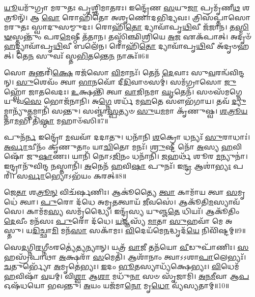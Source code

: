 \-\ul{𑌯𑍂}\-𑌯𑌮𑍁᳴𑌗𑍍𑌰𑌾 𑌮𑌰𑍁𑌤𑌃 𑌪𑍃𑌶𑍍𑌞𑌿𑌮𑌾𑌤𑌰𑌃।
𑌇𑌨𑍍𑌦𑍍𑌰𑍇᳴𑌣 \ul{𑌸}\-𑌯𑍁\-\ul{𑌜𑌾} 𑌪𑍍𑌰𑌮𑍃᳴𑌣𑍀\-\ul{𑌥} 𑌶𑌤𑍍𑌰𑍂𑌨𑍍᳴।
𑌆 \ul{𑌵𑍋} 𑌰𑍋𑌹𑌿᳴𑌤𑍋 𑌅𑌶𑍃𑌣𑍋𑌦𑌭𑌿𑌦𑍍𑌯𑌵𑌃।
𑌤𑍍𑌰𑌿𑌸᳴𑌪𑍍𑌤𑌾𑌸𑍋 𑌮𑌰𑍁𑌤𑌃 𑌸𑍍𑌵𑌾𑌦𑍁𑌸𑌮𑍍𑌮𑍁𑌦𑌃।
𑌰𑍋𑌹𑌿᳴\-\ul{𑌤𑍋} 𑌦𑍍𑌯𑌾𑌵𑌾᳴𑌪𑍃\-\ul{𑌥𑌿}\-𑌵𑍀 𑌜᳴𑌜𑌾𑌨।
𑌤\-\ul{𑌸𑍍𑌮𑌿}\-\-\ul{𑍟}\-𑌸𑍍𑌤𑌨𑍍𑌤𑍁𑌂᳴ 𑌪𑌰\-\ul{𑌮𑍇}\-𑌷𑍍𑌠𑍀 𑌤᳴𑌤𑌾𑌨।
𑌤𑌸𑍍𑌮𑌿᳴𑌞𑍍𑌛𑌿𑌶𑍍𑌰𑌿𑌯𑍇 \ul{𑌅}\-𑌜 𑌏𑌕᳴𑌪𑌾𑌤𑍍।
𑌅𑌦𑍃𑍞᳴\-\ul{𑌹}\-𑌦𑍍𑌦𑍍𑌯𑌾𑌵𑌾᳴𑌪𑍃\-\ul{𑌥𑌿}\-𑌵𑍀 𑌬𑌲𑍇᳴𑌨।
𑌰𑍋𑌹𑌿᳴\-\ul{𑌤𑍋} 𑌦𑍍𑌯𑌾𑌵𑌾᳴𑌪𑍃\-\ul{𑌥𑌿}\-𑌵𑍀 𑌅᳴𑌦𑍃𑍞𑌹𑌤𑍍।
𑌤𑍇\-\ul{𑌨} 𑌸𑍁𑌵𑌃᳴ 𑌸𑍍𑌤\-\ul{𑌭𑌿}\-𑌤𑌨𑍍𑌤𑍇\-\ul{𑌨} 𑌨𑌾𑌕𑌃᳴॥6॥

𑌸𑍋 \ul{𑌅}\-𑌨𑍍𑌤𑌰𑌿᳴\-\ul{𑌕𑍍𑌷𑍇} 𑌰𑌜᳴𑌸𑍋 \ul{𑌵𑌿}\-𑌮𑌾𑌨𑌃᳴।
𑌤𑍇𑌨᳴ \ul{𑌦𑍇}\-𑌵𑌾𑌃 𑌸𑍁\-\ul{𑌵}\-𑌰𑌨𑍍𑌵᳴𑌵𑌿𑌨𑍍𑌦𑌨𑍍।
\-\ul{𑌸𑍁}\-𑌶𑍇𑌵𑌂᳴ 𑌤𑍍𑌵𑌾 \ul{𑌭𑌾}\-𑌨𑌵𑍋᳴ 𑌦𑍀\-\ul{𑌦𑌿}\-𑌵𑌾𑍞𑌸𑌮𑍍॑।
𑌸𑌮᳴𑌗𑍍𑌰𑌾𑌸𑍋 \ul{𑌜𑍁}\-𑌹𑍍𑌵𑍋᳴ 𑌜𑌾𑌤𑌵𑍇𑌦𑌃।
\-\ul{𑌉}\-𑌕𑍍𑌷𑌨𑍍𑌤𑌿᳴ 𑌤𑍍𑌵𑌾 \ul{𑌵𑌾}\-𑌜𑌿\-\ul{𑌨}\-𑌮𑌾 \ul{𑌘𑍃}\-𑌤𑍇𑌨᳴।
𑌸𑍞𑌸᳴𑌮𑌗𑍍𑌨𑍇 𑌯𑍁𑌵\-\ul{𑌸𑍇} 𑌭𑍋𑌜᳴𑌨𑌾𑌨𑌿।
𑌅\-\ul{𑌗𑍍𑌨𑍇} 𑌶𑌰𑍍𑌧᳴ 𑌮\-\ul{𑌹}\-𑌤𑍇 𑌸𑍗𑌭᳴𑌗𑌾𑌯।
𑌤𑌵᳴ \ul{𑌦𑍍𑌯𑍁}\-𑌮𑍍𑌨𑌾𑌨𑍍𑌯𑍁᳴\-\ul{𑌤𑍍𑌤}\-𑌮𑌾𑌨𑌿᳴ 𑌸𑌨𑍍𑌤𑍁।
𑌸𑌞𑍍𑌜𑌾॑\-\ul{𑌸𑍍𑌪}\-𑌤𑍍𑌯𑍞 \ul{𑌸𑍁}\-𑌯\-\ul{𑌮}\-𑌮𑌾 𑌕𑍃᳴𑌣𑍁𑌷𑍍𑌵।
\-\ul{𑌶}\-\-\ul{𑌤𑍍𑌰𑍂}\-\-\ul{𑌯}\-𑌤𑌾\-\ul{𑌮}\-𑌭𑌿 𑌤𑌿᳴\-\ul{𑌷𑍍𑌠𑌾} 𑌮𑌹𑌾𑍞᳴𑌸𑌿॥7॥\anuvakamend[\-\ul{𑌅}\-\-\ul{𑌸𑍍𑌤𑍍𑌵𑍇}\-\-\ul{𑌤𑍁} 𑌰𑍋𑌹𑌿᳴\-\ul{𑌤𑍋} 𑌨𑌾\-\ul{𑌕𑍋} 𑌮𑌹𑌾𑍞᳴𑌸𑌿]

𑌪𑍁𑌨᳴\-\ul{𑌰𑍍𑌨} 𑌇𑌨𑍍𑌦𑍍𑌰𑍋᳴ \ul{𑌮}\-𑌘𑌵𑌾᳴ 𑌦𑌦𑌾𑌤𑍁।
𑌧𑌨𑌾᳴𑌨𑌿 \ul{𑌶}\-𑌕𑍍𑌰𑍋 𑌧𑌨𑍍𑌯𑌃᳴ \ul{𑌸𑍁}\-𑌰𑌾𑌧𑌾𑌃॑।
\-\ul{𑌅}\-\-\ul{𑌰𑍍𑌵𑌾}\-𑌚𑍀𑌨𑌂᳴ 𑌕𑍃𑌣𑍁𑌤𑌾𑌂 𑌯𑌾\-\ul{𑌚𑌿}\-𑌤𑍋 𑌮𑌨𑌃᳴।
\-\ul{𑌶𑍍𑌰𑍁}\-𑌷𑍍𑌟𑍀 𑌨𑍋᳴ \ul{𑌅}\-𑌸𑍍𑌯 \ul{𑌹}\-𑌵𑌿𑌷𑍋᳴ 𑌜𑍁\-\ul{𑌷𑌾}\-𑌣𑌃।
𑌯𑌾𑌨𑌿᳴ 𑌨𑍋𑌽\-\ul{𑌜𑌿}\-𑌨𑌂 𑌧𑌨𑌾᳴𑌨𑌿।
\-\ul{𑌜}\-𑌹𑌰𑍍𑌥᳴ 𑌶𑍂𑌰 \ul{𑌮}\-𑌨𑍍𑌯𑍁𑌨𑌾॑।
𑌇𑌨𑍍𑌦𑍍𑌰𑌾𑌨𑍁᳴𑌵𑌿𑌨𑍍𑌦 \ul{𑌨}\-𑌸𑍍𑌤𑌾𑌨𑌿᳴।
\-\ul{𑌅}\-𑌨𑍇𑌨᳴ \ul{𑌹}\-𑌵𑌿\-\ul{𑌷𑌾} 𑌪𑍁𑌨𑌃᳴।
𑌇\-\ul{𑌨𑍍𑌦𑍍𑌰} 𑌆𑌶𑌾॑\-\ul{𑌭𑍍𑌯𑌃} 𑌪𑌰𑌿᳴।
𑌸\-\ul{𑌰𑍍𑌵𑌾}\-𑌭𑍍𑌯𑍋\-𑌽𑌭᳴𑌯𑌂 𑌕𑌰𑌤𑍍॥8॥

𑌜𑍇\-\ul{𑌤𑌾} 𑌶\-\ul{𑌤𑍍𑌰𑍂}\-\-\ul{𑌨𑍍} 𑌵𑌿𑌚᳴𑌰𑍍\mbox{}𑌷𑌣𑌿𑌃।
𑌆𑌕𑍂॑𑌤𑍍𑌯𑍈 \ul{𑌤𑍍𑌵𑌾} 𑌕𑌾𑌮𑌾᳴𑌯 𑌤𑍍𑌵𑌾 \ul{𑌸}\-𑌮𑍃𑌧𑍇॑ 𑌤𑍍𑌵𑌾।
\-\ul{𑌪𑍁}\-𑌰𑍋 𑌦᳴𑌧𑍇 𑌅𑌮𑍃\-\ul{𑌤}\-𑌤𑍍𑌵𑌾𑌯᳴ \ul{𑌜𑍀}\-𑌵𑌸𑍇॑।
𑌆𑌕𑍂᳴𑌤𑌿\-\ul{𑌮}\-𑌸𑍍𑌯𑌾𑌵᳴𑌸𑍇।
𑌕𑌾𑌮᳴𑌮\-\ul{𑌸𑍍𑌯} 𑌸𑌮𑍃᳴𑌦𑍍𑌧𑍍𑌯𑍈।
𑌇𑌨𑍍𑌦𑍍𑌰᳴𑌸𑍍𑌯 𑌯𑍁𑌞𑍍𑌜\-\ul{𑌤𑍇} 𑌧𑌿𑌯𑌃᳴।
𑌆𑌕𑍂᳴𑌤𑌿𑌂 \ul{𑌦𑍇}\-𑌵𑍀𑌂 𑌮𑌨᳴𑌸𑌃 \ul{𑌪𑍁}\-𑌰𑍋 𑌦᳴𑌧𑍇।
\-\ul{𑌯}\-𑌜𑍍𑌞𑌸𑍍𑌯᳴ \ul{𑌮𑌾}\-𑌤𑌾 \ul{𑌸𑍁}\-𑌹𑌵𑌾᳴ 𑌮𑍇 𑌅𑌸𑍍𑌤𑍁।
𑌯\-\ul{𑌦𑌿}\-𑌚𑍍𑌛𑌾\-\ul{𑌮𑌿} 𑌮𑌨᳴\-\ul{𑌸𑌾} 𑌸𑌕𑌾᳴𑌮𑌃।
\-\ul{𑌵𑌿}\-𑌦𑍇𑌯᳴𑌮𑍇\-\ul{𑌨}\-𑌦𑍍𑌧𑍃𑌦᳴\-\ul{𑌯𑍇} 𑌨𑌿𑌵𑌿᳴𑌷𑍍𑌟𑌮𑍍॥9॥

𑌸𑍇\-\ul{𑌦}\-𑌗𑍍𑌨𑌿\-\ul{𑌰}\-𑌗𑍍𑌨𑍀𑍞𑌰𑌤𑍍𑌯𑍇॑\-\ul{𑌤𑍍𑌯}\-𑌨𑍍𑌯𑌾𑌨𑍍।
𑌯𑌤𑍍𑌰᳴ \ul{𑌵𑌾}\-𑌜𑍀 𑌤𑌨᳴𑌯𑍋 \ul{𑌵𑍀}\-𑌡𑍁𑌪𑌾᳴𑌣𑌿𑌃।
\-\ul{𑌸}\-𑌹𑌸𑍍𑌰᳴𑌪𑌾𑌥𑌾 \ul{𑌅}\-𑌕𑍍𑌷𑌰𑌾᳴ \ul{𑌸}\-𑌮𑍇𑌤𑌿᳴।
𑌆𑌶𑌾᳴𑌨𑌾𑌂 𑌤𑍍𑌵𑌾\-𑌽𑌽𑌶𑌾\-\ul{𑌪𑌾}\-𑌲𑍇𑌭𑍍𑌯𑌃᳴।
\-\ul{𑌚}\-𑌤𑍁𑌰𑍍𑌭𑍍𑌯𑍋᳴ \ul{𑌅}\-𑌮𑍃𑌤𑍇॑𑌭𑍍𑌯𑌃।
\-\ul{𑌇}\-𑌦𑌂 \ul{𑌭𑍂}\-𑌤𑌸𑍍𑌯𑌾𑌧𑍍𑌯᳴𑌕𑍍𑌷𑍇𑌭𑍍𑌯𑌃।
\-\ul{𑌵𑌿}\-𑌧𑍇𑌮᳴ \ul{𑌹}\-𑌵𑌿𑌷𑌾᳴ \ul{𑌵}\-𑌯𑌮𑍍।
𑌵𑌿\-\ul{𑌶𑍍𑌵𑌾} 𑌆\-\ul{𑌶𑌾} 𑌮𑌧𑍁᳴\-\ul{𑌨𑌾} 𑌸𑍞 𑌸𑍃᳴𑌜𑌾𑌮𑌿।
\-\ul{𑌅}\-\-\ul{𑌨}\-\-\ul{𑌮𑍀}\-𑌵𑌾 𑌆\-\ul{𑌪} 𑌓𑌷᳴𑌧𑌯𑍋 𑌭𑌵𑌨𑍍𑌤𑍁।
\-\ul{𑌅}\-𑌯𑌂 𑌯𑌜᳴𑌮𑌾\-\ul{𑌨𑍋} 𑌮𑍃\-\ul{𑌧𑍋} 𑌵𑍍𑌯᳴𑌸𑍍𑌯𑌤𑌾𑌮𑍍॥10॥


